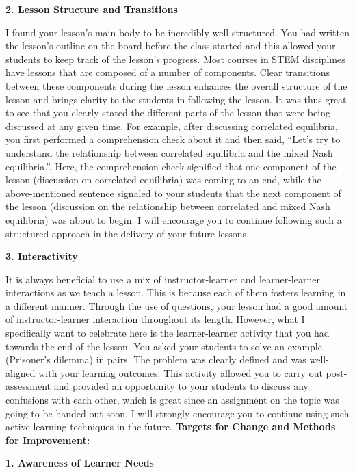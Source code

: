 \documentclass{article}
\begin{document}
\textbf{2. Lesson Structure and Transitions}

I found your lesson’s main body to be incredibly well-structured. You had written the lesson’s outline on the board before the class started and this allowed your students to keep track of the lesson’s progress. Most courses in STEM disciplines have lessons that are composed of a number of components. Clear transitions between these components during the lesson enhances the overall structure of the lesson and brings clarity to the students in following the lesson. It was thus great to see that you clearly stated the different parts of the lesson that were being discussed at any given time. For example, after discussing correlated equilibria, you first performed a comprehension check about it and then said, “Let’s try to understand the relationship between correlated equilibria and the mixed Nash equilibria.”. Here, the comprehension check signified that one component of the lesson (discussion on correlated equilibria) was coming to an end, while the above-mentioned sentence signaled to your students that the next component of the lesson (discussion on the relationship between correlated and mixed Nash equilibria) was about to begin. I will encourage you to continue following such a structured approach in the delivery of your future lessons.

\textbf{3. Interactivity}

It is always beneficial to use a mix of instructor-learner and learner-learner interactions as we teach a lesson. This is because each of them fosters learning in a different manner. Through the use of questions, your lesson had a good amount of instructor-learner interaction throughout its length. However, what I specifically want to celebrate here is the learner-learner activity that you had towards the end of the lesson. You asked your students to solve an example (Prisoner’s dilemma) in pairs. The problem was clearly defined and was well-aligned with your learning outcomes. This activity allowed you to carry out post-assessment and provided an opportunity to your students to discuss any confusions with each other, which is great since an assignment on the topic was going to be handed out soon. I will strongly encourage you to continue using such active learning techniques in the future.\newline
\textbf{Targets for Change and Methods for Improvement:}

\textbf{1. Awareness of Learner Needs}
\end{document}
